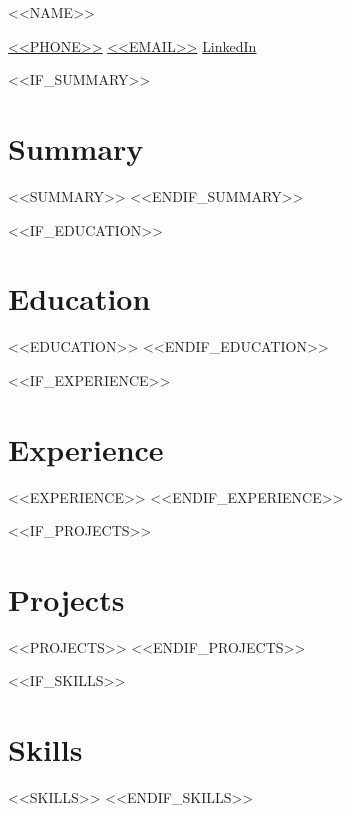 \documentclass[11pt]{article}
\begin{document}
\begin{center}
  {
    \fontsize{36}{12} 
    \selectfont
    \color{accent} 
    <<NAME>>
  } \\ \medskip

  \href{tel:<<PHONE>>}{{\color{gray}{\faPhone}} <<PHONE>>} \quad
  \href{mailto:<<EMAIL>>}{{\color{gray}{\faEnvelope}} <<EMAIL>>} \quad 
  \href{<<LINKEDIN>>}{{\color{gray}{\faLinkedin}} LinkedIn}
\end{center}

<<IF_SUMMARY>>
\section{Summary}
<<SUMMARY>>
<<ENDIF_SUMMARY>>

<<IF_EDUCATION>>
\section{Education}
<<EDUCATION>>
<<ENDIF_EDUCATION>>

<<IF_EXPERIENCE>>
\section{Experience}
<<EXPERIENCE>>
<<ENDIF_EXPERIENCE>>

<<IF_PROJECTS>>
\section{Projects}
<<PROJECTS>>
<<ENDIF_PROJECTS>>

<<IF_SKILLS>>
\section{Skills}
<<SKILLS>>
<<ENDIF_SKILLS>>
\end{document}
